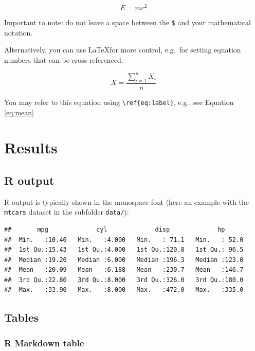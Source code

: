 \documentclass[
11pt,
a4paper]{article}
\begin{document}
\[E = mc^2\]

Important to note: do not leave a space between the \texttt{\$} and your
mathematical notation.

Alternatively, you can use \LaTeX for more control, e.g.~for setting
equation numbers that can be cross-referenced:

\begin{equation} \label{eq:mean}
  \bar{X} = \frac{\sum_{i=1}^n X_i}{n}
\end{equation}

You may refer to this equation using
\texttt{\textbackslash{}ref\{eq:label\}}, e.g., see Equation
\ref{eq:mean}

\newpage

\hypertarget{results}{%
\section{Results}\label{results}}

\hypertarget{r-output}{%
\subsection{R output}\label{r-output}}

R output is typically shown in the monospace font (here an example with
the \texttt{mtcars} dataset in the subfolder \texttt{data/}):

\begin{verbatim}
##       mpg             cyl             disp             hp       
##  Min.   :10.40   Min.   :4.000   Min.   : 71.1   Min.   : 52.0  
##  1st Qu.:15.43   1st Qu.:4.000   1st Qu.:120.8   1st Qu.: 96.5  
##  Median :19.20   Median :6.000   Median :196.3   Median :123.0  
##  Mean   :20.09   Mean   :6.188   Mean   :230.7   Mean   :146.7  
##  3rd Qu.:22.80   3rd Qu.:8.000   3rd Qu.:326.0   3rd Qu.:180.0  
##  Max.   :33.90   Max.   :8.000   Max.   :472.0   Max.   :335.0
\end{verbatim}

\hypertarget{tables}{%
\subsection{Tables}\label{tables}}

\hypertarget{r-markdown-table}{%
\subsubsection{R Markdown table}\label{r-markdown-table}}
\end{document}
